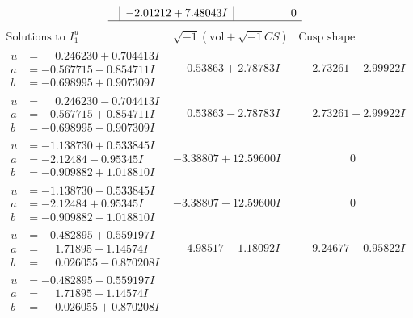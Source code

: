 \documentclass[1p]{elsarticle_modified}
\theoremstyle{definition}
\newcommand{\I}{\sqrt{-1}}
\begin{document}
$$\begin{array}{c|c|c}
 & -2.01212 + 7.48043 I & \phantom{-0.000000 } 0\\
 \hline 
 \end{array}$$\newpage$$\begin{array}{c|c|c}  
\text{Solutions to }I^u_{1}& \I (\text{vol} + \sqrt{-1}CS) & \text{Cusp shape}\\
 \hline 
\begin{aligned}
u &= \phantom{-}0.246230 + 0.704413 I \\
a &= -0.567715 - 0.854711 I \\
b &= -0.698995 + 0.907309 I\end{aligned}
 & \phantom{-}0.53863 + 2.78783 I & \phantom{-}2.73261 - 2.99922 I \\ \hline\begin{aligned}
u &= \phantom{-}0.246230 - 0.704413 I \\
a &= -0.567715 + 0.854711 I \\
b &= -0.698995 - 0.907309 I\end{aligned}
 & \phantom{-}0.53863 - 2.78783 I & \phantom{-}2.73261 + 2.99922 I \\ \hline\begin{aligned}
u &= -1.138730 + 0.533845 I \\
a &= -2.12484 - 0.95345 I \\
b &= -0.909882 + 1.018810 I\end{aligned}
 & -3.38807 + 12.59600 I & \phantom{-0.000000 } 0 \\ \hline\begin{aligned}
u &= -1.138730 - 0.533845 I \\
a &= -2.12484 + 0.95345 I \\
b &= -0.909882 - 1.018810 I\end{aligned}
 & -3.38807 - 12.59600 I & \phantom{-0.000000 } 0 \\ \hline\begin{aligned}
u &= -0.482895 + 0.559197 I \\
a &= \phantom{-}1.71895 + 1.14574 I \\
b &= \phantom{-}0.026055 - 0.870208 I\end{aligned}
 & \phantom{-}4.98517 - 1.18092 I & \phantom{-}9.24677 + 0.95822 I \\ \hline\begin{aligned}
u &= -0.482895 - 0.559197 I \\
a &= \phantom{-}1.71895 - 1.14574 I \\
b &= \phantom{-}0.026055 + 0.870208 I\end{aligned}

\end{array}$$
\end{document}
